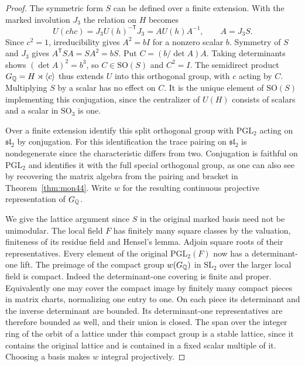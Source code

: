 \documentclass[a4paper,11pt]{article}
\theoremstyle{definition}
\theoremstyle{remark}
\numberwithin{equation}{section}
\begin{document}
\begin{proof}
The symmetric form \(S\) can be defined over a finite extension.
With the marked involution \(J_3\) the relation on \(H\) becomes
\[
       U(chc)=J_3 U(h)^{-\mathsf T}J_3
             = A U(h)A^{-1},\qquad A=J_3 S .
\]
Since \(c^2=1\), irreducibility gives \(A^2=bI\) for a
nonzero scalar \(b\). Symmetry of \(S\) and \(J_3\) gives
\(A^{\mathsf T}S A=S A^2=bS\). Put
\(C=(b/\det A)A\). Taking determinants shows
\((\det A)^2=b^3\), so \(C\in\mathrm{SO}(S)\) and \(C^2=I\).
The semidirect product \(G_\mathbb Q=H\rtimes\langle c\rangle\)
thus extends \(U\) into this orthogonal group, with \(c\)
acting by \(C\). Multiplying \(S\) by a scalar has no effect
on \(C\). It is the unique element of \(\mathrm{SO}(S)\)
implementing this conjugation, since the centralizer of \(U(H)\)
consists of scalars and a scalar in \(\mathrm{SO}_3\) is one.

Over a finite extension identify this split orthogonal group
with \(\mathrm{PGL}_2\) acting on \(\mathfrak{sl}_2\) by
conjugation. For this identification the trace pairing on
\(\mathfrak{sl}_2\) is nondegenerate since the characteristic
differs from two. Conjugation is faithful on \(\mathrm{PGL}_2\)
and identifies it with the full special orthogonal group, as
one can also see by recovering the matrix algebra from the
pairing and bracket in Theorem~\ref{thm:mon44}. Write \(w\)
for the resulting continuous projective representation of
\(G_\mathbb Q\).

We give the lattice argument since \(S\) in the original
marked basis need not be unimodular. The local field \(F\)
has finitely many square classes by the valuation, finiteness
of its residue field and Hensel's lemma. Adjoin square roots
of their representatives. Every element of the original
\(\mathrm{PGL}_2(F)\) now has a determinant-one lift.
The preimage of the compact group \(w(G_\mathbb Q)\) in
\(\mathrm{SL}_2\) over the larger local field is compact.
Indeed the determinant-one covering is finite and proper.
Equivalently one may cover the compact image by finitely
many compact pieces in matrix charts, normalizing one entry
to one. On each piece its determinant and the inverse
determinant are bounded. Its determinant-one representatives
are therefore bounded as well, and their union is closed.
The span over the integer ring of the orbit of a lattice under
this compact group is a stable lattice, since it contains the
original lattice and is contained in a fixed scalar multiple
of it. Choosing a basis makes \(w\) integral projectively.


\end{proof}
\end{document}
